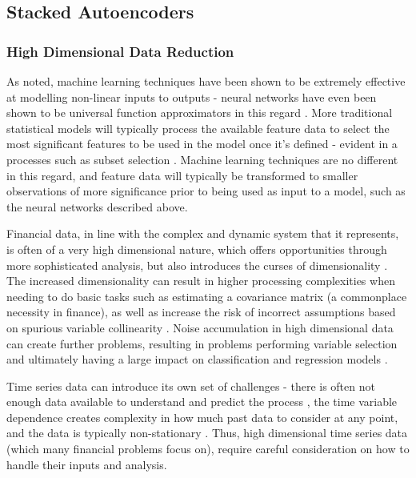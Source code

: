\documentclass[a4paper,11pt,oneside]{article}
\theoremstyle{plain}
\theoremstyle{definition}
\begin{document}
\subsection{Stacked Autoencoders}\label{lr_SAE}

\subsubsection{High Dimensional Data Reduction}\label{HDDR}

As noted, machine learning techniques have been shown to be extremely effective at modelling non-linear inputs 
to outputs - neural networks have even been shown to be universal function approximators in this regard \cite{Hornik}. 
More traditional statistical models will typically process the available feature data to select the most significant 
features to be used in the model once it’s defined - evident in a processes such as subset selection \cite{Schaefer}. 
Machine learning techniques are no different in this regard, and feature data will typically be transformed to smaller 
observations of more significance prior to being used as input to a model, such as the neural networks described above.
\hfill \break 

Financial data, in line with the complex and dynamic system that it represents, is often of a very high dimensional 
nature, which offers opportunities through more sophisticated analysis, but also introduces the curses of
 dimensionality \cite{Donoho}. The increased dimensionality can result in higher processing complexities when needing to 
 do basic tasks such as estimating a covariance matrix (a commonplace necessity in finance), as well as increase 
 the risk of incorrect assumptions based on spurious variable collinearity \cite{Fan1}. Noise accumulation in high 
 dimensional data can create further problems, resulting in problems performing variable selection and ultimately 
 having a large impact on classification and regression models \cite{Fan2}.
\hfill \break 

Time series data can introduce its own set of challenges - there is often not enough data available to understand 
and predict the process \cite{Fama}, the time variable dependence creates complexity in how much past 
data to consider at any point, and the data is typically non-stationary \cite{Langkvist}. Thus, high dimensional time 
series data (which many financial problems focus on), require careful consideration on how to handle their inputs 
and analysis.
\hfill \break 
\end{document}
